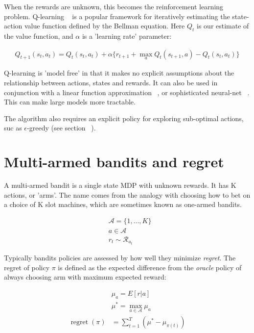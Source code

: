 \documentclass[11pt,a4,singlespacing,titlepagenumber=on]{scrreprt}
\numberwithin{equation}{chapter} %
\theoremstyle{remark}
\begin{document}
When the rewards are unknown, this becomes the reinforcement learning problem. Q-learning ~\cite{watkins1992q} is a popular framework for iteratively estimating the state-action value function defined by the Bellman equation. Here $Q_t$ is our estimate of the value function, and $\alpha$ is a 'learning rate' parameter:

\begin{align}
Q_{t+1}(s_t,a_t) = Q_t(s_t,a_t) + \alpha\{r_{t+1} + \max_a Q_t(s_{t+1},a) -Q_t(s_t,a_t)\}
\end{align}

Q-learning is 'model free' in that it makes no explicit assumptions about the relationship between actions, states and rewards. It can also be used in conjunction with a linear function approximation ~\cite{tsitsiklis1997analysis}, or sophisticated neural-net ~\cite{mnih2013playing}. This can make large models more tractable.

The algorithm also requires an explicit policy for exploring sub-optimal actions, suc as $\epsilon$-greedy (see section ~).

\section{ Multi-armed bandits and regret}

A multi-armed bandit is a single state MDP with unknown rewards. It has K actions, or 'arms'. The name comes from the analogy with choosing how to bet on a choice of K slot machines, which are sometimes known as one-armed bandits.

\begin{align}
&\mathcal{A} = \{1,...,K\} \\
&a \in \mathcal{A} \\
&r_t \sim \mathcal{R}_{a_t} 
\end{align}

Typically bandits policies are assessed by how well they minimize \textit{regret}. The regret of policy $\pi$ is defined as the expected difference from the \textit{oracle} policy of always choosing arm with maximum expected reward:

\begin{align}
&\mu_a = E[r|a] \\
&\mu^{*} = \max_{a \in \mathcal{A}} \mu_a \\
\operatorname{regret}(\pi) &= \sum_{t=1}^T (\mu^{*} - \mu_{\pi(t)})
\end{align}
\end{document}
